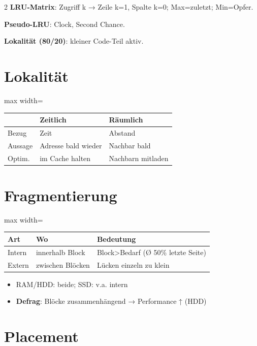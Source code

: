 \documentclass[10pt, a4paper]{article}
\begin{document}
\begin{multicols}{2}
\textbf{LRU-Matrix}: Zugriff k → Zeile k=1, Spalte k=0; Max=zuletzt; Min=Opfer.


\textbf{Pseudo-LRU}: Clock, Second Chance.


\textbf{Lokalität (80/20)}: kleiner Code-Teil aktiv.



\section{Lokalität}


{\small
\begin{adjustbox}{max width=\linewidth}
{\scriptsize
\begin{tabular}{lll}
\toprule
\textbf{} & \textbf{Zeitlich} & \textbf{Räumlich} \\
\midrule
Bezug & Zeit & Abstand \\
Aussage & Adresse bald wieder & Nachbar bald \\
Optim. & im Cache halten & Nachbarn mitladen \\
\bottomrule
\end{tabular}
}
\end{adjustbox}
}



\section{Fragmentierung}


{\small
\begin{adjustbox}{max width=\linewidth}
{\scriptsize
\begin{tabular}{lll}
\toprule
\textbf{Art} & \textbf{Wo} & \textbf{Bedeutung} \\
\midrule
Intern & innerhalb Block & Block>Bedarf (Ø 50\% letzte Seite) \\
Extern & zwischen Blöcken & Lücken einzeln zu klein \\
\bottomrule
\end{tabular}
}
\end{adjustbox}
}


\begin{itemize}
  \item RAM/HDD: beide; SSD: v.a. intern
  \item \textbf{Defrag}: Blöcke zusammenhängend → Performance ↑ (HDD)
\end{itemize}


\section{Placement}


\end{multicols}
\end{document}
